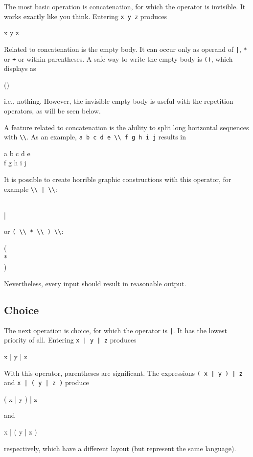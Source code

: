 \documentclass[a4paper]{article}
\begin{document}
The most basic operation is concatenation, for which the operator is
invisible. It works exactly like you think. Entering \verb!x y z!
produces
\begin{rail}
x y z
\end{rail}
Related to concatenation is the empty body. It can occur only as operand
of \verb!|!, \verb!*! or \verb!+! or within parentheses. A safe way to
write the empty body is \verb!()!, which displays as
\begin{rail}
()
\end{rail}
i.e., nothing. However, the invisible empty body is useful with the
repetition operators, as will be seen below.

A feature related to concatenation is the ability to split long
horizontal sequences with \verb!\\!.
As an example,
\verb!a b c d e \\ f g h i j! results in
\begin{rail}
a b c d e \\ f g h i j
\end{rail}
It is possible to create horrible graphic constructions with this
operator, for example \verb!\\ | \\!:
\begin{rail}
\\ | \\
\end{rail}
or \verb!( \\ * \\ ) \\!:
\begin{rail}
( \\ * \\ ) \\
\end{rail}
Nevertheless, every input should result in reasonable output.

\subsection{Choice}

The next operation is choice, for which the operator is \verb!|!.
It has the lowest priority of all. Entering \verb!x | y | z! produces
\begin{rail}
x | y | z
\end{rail}
With this operator, parentheses are significant. The expressions
\verb!( x | y ) | z! and \verb!x | ( y | z )! produce
\begin{rail}
( x | y ) | z
\end{rail}
and
\begin{rail}
x | ( y | z )
\end{rail}
respectively, which have a different layout (but represent the same
language).
\end{document}
